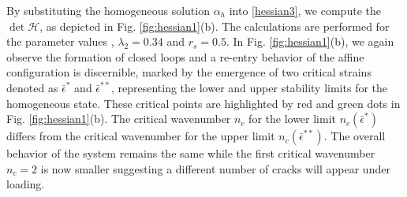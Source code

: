 By substituting the homogeneous solution $\alpha_h$ into \eqref{hessian3}, we compute  the $\det \mathcal{H}$, as depicted  in Fig. \ref{fig:hessian1}(b). The calculations are performed for the parameter values , $\lambda_2=0.34$ and $r_s=0.5$.  In Fig. \ref{fig:hessian1}(b), we again observe the formation of closed loops and a re-entry behavior of the affine configuration is discernible, marked by the emergence of two critical strains denoted as $\bar\epsilon^*$ and $\bar\epsilon^{**}$, representing the lower and upper stability limits for the homogeneous state. These critical points are highlighted by red and green dots in Fig. \ref{fig:hessian1}(b). The critical wavenumber $n_c$ for the lower limit $n_c(\bar{\epsilon}^*)$    differs from the critical wavenumber for the upper limit $n_c(\bar{\epsilon}^{**})$. The overall behavior of the system remains the same while the first critical wavenumber $n_c=2$ is now smaller suggesting a different number of cracks will appear under loading.
